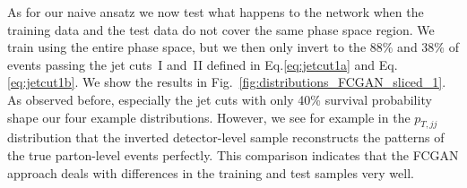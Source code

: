 As for our naive ansatz we now test what happens to the network when
the training data and the test data do not cover the same phase space
region. We train using the entire phase space, but we then only
invert to the 88\% and 38\% of events passing the jet
cuts~I and~II defined in Eq.\eqref{eq:jetcut1a} and
Eq.\eqref{eq:jetcut1b}. We show the results in
Fig.~\ref{fig:distributions_FCGAN_sliced_1}. As observed before,
especially the jet cuts with only 40\% survival probability shape our
four example distributions. However, we see for example in the
$p_{T,jj}$ distribution that the inverted detector-level sample
reconstructs the patterns of the true parton-level events
perfectly. This comparison indicates that the FCGAN approach deals
with differences in the training and test samples very well.

